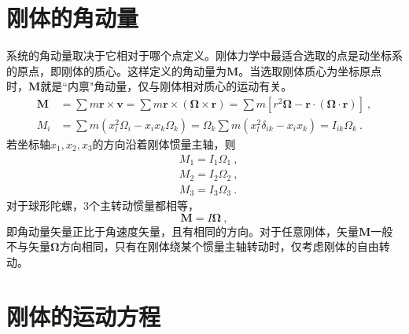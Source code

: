 \documentclass[12pt,a4paper]{article}
\renewcommand{\vec}[1]{\boldsymbol{#1}}
\begin{document}
\section{刚体的角动量}
\cite{2007理论物理学教程} 系统的角动量取决于它相对于哪个点定义。刚体力学中最适合选取的点是动坐标系的原点，即刚体的质心。这样定义的角动量为$\vec{M}$。当选取刚体质心为坐标原点时，$\vec{M}$就是``内禀"角动量，仅与刚体相对质心的运动有关。
\begin{align*}
\vec{M} &= \sum m \vec{r} \times \vec{v} = \sum m \vec{r} \times (\vec{\Omega} \times \vec{r}) = \sum m [r^2 \vec{\Omega} -\vec{r} \cdot (\vec{\Omega} \cdot \vec{r}) ] ~, \\
M_i &= \sum m (x_l^2 \Omega_i - x_i x_k \Omega_k) = \Omega_k \sum m (x_l^2 \delta_{ik} - x_i x_k) = I_{ik}\Omega_k ~.
\end{align*}
若坐标轴$x_1, x_2, x_3$的方向沿着刚体惯量主轴，则
\begin{align}
\nonumber & M_1 = I_1 \Omega_1 ~, \\
\nonumber & M_2 = I_2 \Omega_2 ~, \\ 
& M_3 = I_3 \Omega_3 ~.
\end{align}
对于球形陀螺，$3$个主转动惯量都相等，
\begin{equation}
\vec{M} = I \vec{\Omega} ~,
\end{equation}
即角动量矢量正比于角速度矢量，且有相同的方向。对于任意刚体，矢量$\vec{M}$一般不与矢量$\vec{\Omega}$方向相同，只有在刚体绕某个惯量主轴转动时，仅考虑刚体的自由转动。































\section{刚体的运动方程}
\cite{2007理论物理学教程} 
\end{document}
